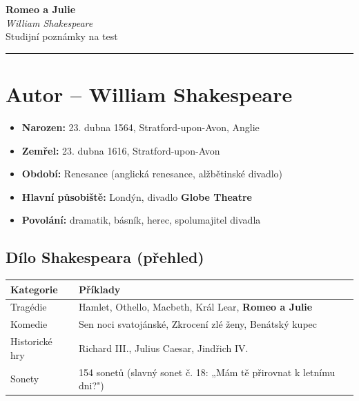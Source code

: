 \documentclass[12pt,a4paper]{article}
\begin{document}
\pagecolor{darkbg}
\color{textmain}

\begin{center}
  {\Huge \textbf{\textcolor{primary}{Romeo a Julie}}}\\[0.3em]
  {\large \textit{William Shakespeare}}\\[0.2em]
  {\normalsize \textcolor{textdim}{Studijní poznámky na test}}\\[1em]
  \rule{\linewidth}{1pt}
\end{center}

\section{Autor – William Shakespeare}

\begin{itemize}[leftmargin=1.5em]
  \item \textbf{Narozen:} 23. dubna 1564, Stratford-upon-Avon, Anglie
  \item \textbf{Zemřel:} 23. dubna 1616, Stratford-upon-Avon
  \item \textbf{Období:} Renesance (anglická renesance, alžbětinské divadlo)
  \item \textbf{Hlavní působiště:} Londýn, divadlo \textbf{Globe Theatre}
  \item \textbf{Povolání:} dramatik, básník, herec, spolumajitel divadla
\end{itemize}

\subsection{Dílo Shakespeara (přehled)}

\begin{tabular}{ll}
  \toprule
  \textbf{Kategorie} & \textbf{Příklady} \\
  \midrule
  Tragédie & Hamlet, Othello, Macbeth, Král Lear, \textbf{Romeo a Julie} \\
  Komedie & Sen noci svatojánské, Zkrocení zlé ženy, Benátský kupec \\
  Historické hry & Richard III., Julius Caesar, Jindřich IV. \\
  Sonety & 154 sonetů (slavný sonet č. 18: „Mám tě přirovnat k letnímu dni?") \\
  \bottomrule
\end{tabular}

\end{document}
